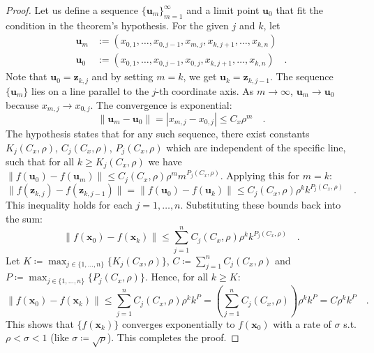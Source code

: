 \documentclass[../../main.tex]{subfiles}
\begin{document}
\begin{proof}
Let us define a sequence $\{\bm{u}_m\}_{m=1}^\infty$ and a limit point $\bm{u}_0$ that fit the condition in the theorem's hypothesis. For the given $j$ and $k$, let
\begin{align*}
    \bm{u}_m &:= (x_{0,1}, \dots, x_{0,j-1}, x_{m,j}, x_{k,j+1}, \dots, x_{k,n}) \\
    \bm{u}_0 &:= (x_{0,1}, \dots, x_{0,j-1}, x_{0,j}, x_{k,j+1}, \dots, x_{k,n}) \quad .
\end{align*}
Note that $\bm{u}_0 = \bm{z}_{k,j}$ and by setting $m=k$, we get $\bm{u}_k = \bm{z}_{k,j-1}$.
The sequence $\{\bm{u}_m\}$ lies on a line parallel to the $j$-th coordinate axis. As $m \to \infty$, $\bm{u}_m \to \bm{u}_0$ because $x_{m,j} \to x_{0,j}$. The convergence is exponential:
\[
    \|\bm{u}_m - \bm{u}_0\| = |x_{m,j} - x_{0,j}| \le C_x \rho^m \quad .
\]
The hypothesis states that for any such sequence, there exist constants $K_j(C_x, \rho)$, $C_j(C_x, \rho)$, $P_j(C_x, \rho)$ which are independent of the specific line, such that for all $k \geq K_j(C_x, \rho)$ we have $\|f(\bm{u}_0) - f(\bm{u}_m)\| \le C_j(C_x, \rho) \rho^m m^{P_j(C_x, \rho)}$. Applying this for $m=k$:
\[
    \|f(\bm{z}_{k,j}) - f(\bm{z}_{k,j-1})\| = \|f(\bm{u}_0) - f(\bm{u}_k)\| \leq C_j(C_x, \rho) \rho^k k^{P_j(C_x, \rho)} \quad .
\]
This inequality holds for each $j=1, \dots, n$. Substituting these bounds back into the sum:
\[
    \|f(\bm{x}_0) - f(\bm{x}_k)\| \le \sum_{j=1}^{n} C_j(C_x, \rho) \rho^k k^{P_j(C_x, \rho)} \quad .
\]
Let $K \coloneqq \max_{j \in \{1, \dots, n\}} \{K_j(C_x, \rho)\}$, $C \coloneqq \sum_{j=1}^{n} C_j(C_x, \rho)$ and \\
$P \coloneqq \max_{j \in \{1, \dots, n\}} \{P_j(C_x, \rho)\}$. Hence, for all $k \geq K$:
\[
    \|f(\bm{x}_0) - f(\bm{x}_k)\| \le \sum_{j=1}^{n} C_j(C_x, \rho) \rho^k k^P = \left( \sum_{j=1}^{n} C_j(C_x, \rho) \right) \rho^k k^P = C \rho^k k^P \quad .
\]
This shows that $\{f(\bm{x}_k)\}$ converges exponentially to $f(\bm{x}_0)$ with a rate of $\sigma$ s.t. $\rho < \sigma < 1$ (like $\sigma \coloneqq \sqrt{\rho}$). This completes the proof.
\end{proof}
\end{document}
